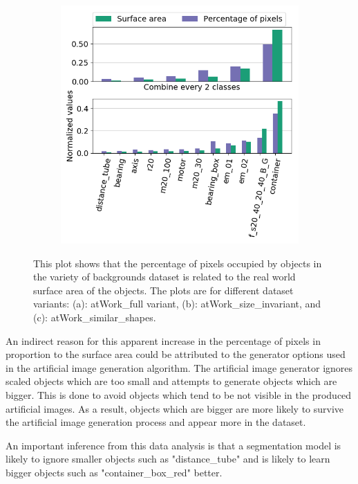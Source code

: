 \begin{figure}
\begin{subfigure}{.47\textwidth}
				\includegraphics[width=1\linewidth]{images/analyzer_shape}
				\caption{}
				\label{Fig:analyzerc}
			\end{subfigure}
			\caption{This plot shows that the percentage of pixels occupied by objects in the variety of backgrounds dataset is related to the real world surface area of the objects. The plots are for different dataset variants: (a): atWork\_full variant, (b): atWork\_size\_invariant, and (c): atWork\_similar\_shapes.}
			\label{Fig:analyzer}
		\end{figure}		
		
An indirect reason for this apparent increase in the percentage of pixels in proportion to the surface area could be attributed to the generator options used in the artificial image generation algorithm. The artificial image generator ignores scaled objects which are too small and attempts to generate objects which are bigger. This is done to avoid objects which tend to be not visible in the produced artificial images. As a result, objects which are bigger are more likely to survive the artificial image generation process and appear more in the dataset. 

An important inference from this data analysis is that a segmentation model is likely to ignore smaller objects such as "distance\_tube" and is likely to learn bigger objects such as "container\_box\_red" better. 

